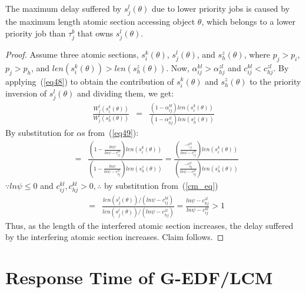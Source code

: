 %
\begin{clm}
\label{max_pri_inv}
The maximum delay suffered by $s_j^l(\theta)$ due to lower priority jobs is caused by the maximum length atomic section accessing object $\theta$, which belongs to a lower priority job than $\tau_j^b$ that owns $s_j^l(\theta)$.
\end{clm}

\begin{proof}\normalfont
Assume three atomic sections, $s_i^k(\theta)$, $s_j^l(\theta)$, and $s_h^z(\theta)$, where $p_j>p_i$, $p_j>p_h$, and $len(s_i^k(\theta))>len(s_h^z(\theta))$. Now, $\alpha_{ij}^{kl}>\alpha_{hj}^{zl}$ and $c_{ij}^{kl}<c_{hj}^{zl}$. By applying~(\ref{eq48}) to obtain the contribution of $s_i^k(\theta)$ and $s_h^z(\theta)$ to the priority inversion of $s_j^l(\theta)$ and dividing them, we get:
\begin{eqnarray*}
\frac{W_{j}^{l}(s_{i}^{k}(\theta))}{W_{j}^{l}(s_{h}^{z}(\theta))} & = & \frac{\left(1-\alpha_{ij}^{kl}\right)len(s_{i}^{k}(\theta))}{\left(1-\alpha_{hj}^{zl}\right)len(s_{h}^{z}(\theta))}
\end{eqnarray*}
By substitution for $\alpha$s from~(\ref{eq49}):
\begin{eqnarray*}
 & = & \frac{(1-\frac{ln\psi}{ln\psi-c_{ij}^{kl}})len(s_{i}^{k}(\theta))}{(1-\frac{ln\psi}{ln\psi-c_{hj}^{zl}})len(s_{h}^{z}(\theta))}
  =  \frac{(\frac{-c_{ij}^{kl}}{ln\psi-c_{ij}^{kl}})len(s_{i}^{k}(\theta))}{(\frac{-c_{hj}^{zl}}{ln\psi-c_{hj}^{zl}})len(s_{h}^{z}(\theta))}\end{eqnarray*}
$\because ln\psi \le 0$ and $c_{ij}^{kl},c_{hj}^{kl} > 0, \therefore$ by substitution from~(\ref{cm_eq})
\begin{eqnarray*}
 & = & \frac{len(s_{j}^{l}(\theta))/(ln\psi-c_{ij}^{kl})}{len(s_{j}^{l}(\theta))/(ln\psi-c_{hj}^{zl})}
  =  \frac{ln\psi-c_{hj}^{zl}}{ln\psi-c_{ij}^{kl}}>1\end{eqnarray*}
Thus, as the length of the interfered atomic section increases, the delay suffered by the interfering atomic section increases. Claim follows.
\end{proof}


\section{\label{response g-edf/lcm}Response Time of G-EDF/LCM}


